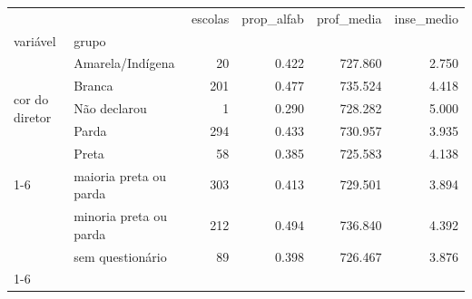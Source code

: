 \begin{tabular}{llrrrr}
\toprule
 &  & escolas & prop\_alfab & prof\_media & inse\_medio \\
variável & grupo &  &  &  &  \\
\midrule
\multirow[t]{5}{*}{cor do diretor} & Amarela/Indígena & 20 & 0.422 & 727.860 & 2.750 \\
 & Branca & 201 & 0.477 & 735.524 & 4.418 \\
 & Não declarou & 1 & 0.290 & 728.282 & 5.000 \\
 & Parda & 294 & 0.433 & 730.957 & 3.935 \\
 & Preta & 58 & 0.385 & 725.583 & 4.138 \\
\cline{1-6}
\multirow[t]{3}{*}{professores} & maioria preta ou parda & 303 & 0.413 & 729.501 & 3.894 \\
 & minoria preta ou parda & 212 & 0.494 & 736.840 & 4.392 \\
 & sem questionário & 89 & 0.398 & 726.467 & 3.876 \\
\cline{1-6}
\bottomrule
\end{tabular}
